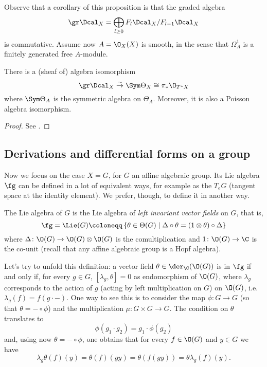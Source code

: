 \documentclass[a4paper, 10pt]{article}
\begin{document}
            Observe that a corollary of this proposition is that the graded algebra \[\gr \Dcal_X = \bigoplus_{l \geq 0} F_l\Dcal_X/F_{l-1}\Dcal_X \] is commutative. Assume now $A = \O_X(X)$ is smooth, in the sense that $\Omega^1_A$ is a finitely generated free $A$-module. 
            \begin{prop}
                There is a (sheaf of) algebra isomorphism \[\gr\Dcal_X \stackrel{\sim}{\to} \Sym \Theta_X \cong \pi_*\O_{T^*X} \] where $\Sym \Theta_A$ is the symmetric algebra on $\Theta_A$. Moreover, it is also a Poisson algebra isomorphism.
            \end{prop}
            \begin{proof}
                See \cite[p.75]{Malikov2017}.
            \end{proof}
        \subsection{Derivations and differential forms on a group}
            Now we focus on the case $X = G$, for $G$ an affine algebraic group. Its Lie algebra $\fg$ can be defined in a lot of equivalent ways, for example as the $T_eG$ (tangent space at the identity element).
            We prefer, though, to define it in another way.
            \begin{defn}
                \label{defn:left_inv}
                The Lie algebra of $G$ is the Lie algebra of \emph{left invariant vector fields} on $G$, that is, \[\fg = \Lie(G) \coloneqq \left\{ \theta \in \Theta(G) \mid \Delta \circ \theta = (1 \otimes \theta) \circ \Delta \right\} \] where $\Delta\colon \O(G) \to \O(G) \otimes \O(G)$ is the comultiplication and $1\colon \O(G) \to \C$ is the co-unit (recall that any affine algebraic group is a Hopf algebra).
            \end{defn}
            Let's try to unfold this definition: a vector field $\theta \in \der_{\C}(\O(G))$ is in $\fg$ if and only if, for every $g \in G$, $[\lambda_g, \theta] = 0$ as endomorphism of $\O(G)$, where $\lambda_g$ corresponds to the action of $g$ (acting by left multiplication on $G$) on $\O(G)$, i.e.\ $\lambda_g(f) = f(g \cdot -)$. One way to see this is to consider the map $\phi\colon G \to G$ (so that $\theta = - \circ \phi$) and the multiplication $\mu\colon G \times G \to G$. The condition on $\theta$ translates to \[\phi(g_1 \cdot g_2) = g_1 \cdot \phi(g_2) \] and, using now $\theta = -\circ \phi$, one obtains that for every $f \in \O(G)$ and $y \in G$ we have \[\lambda_g\theta(f)(y) = \theta(f)(gy) = \theta(f(gy)) = \theta\lambda_g(f)(y). \] 
\end{document}

